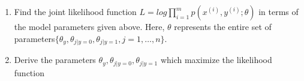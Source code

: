 \documentclass[submit]{harvardml}
\begin{document}
\begin{problem}
\begin{enumerate}[label=(\alph*)]In this problem, we look at maximum likelihood parameter estimation using the naive
Bayes assumption. Here, the input features $x_j, j = 1, . . . , n$ to our model are discrete,
binary-valued variables, so $x_j \in \{0, 1\}$. We call $x = [x_1,  x_2 , \dots  x_n]^T$ to be the input vector.
For each training example, our output targets are a single binary-value $y ∈ {0, 1}$. Our
model is then parameterized by $\theta_{j|y=0} = p(x_j = 1|y = 0), \theta_{j|y=1} = p(x_j = 1|y = 1)$, and
$\theta_y = p(y = 1)$. We model the joint distribution of $(x, y)$ according to
\begin{align*}
P(y)&=(\theta_y)^y (1-\theta_y)^{1-y}\\
p(x|y=0)&=\prod_{j=1}^n p(x_j|y=0)\\
p(x|y=1)&=\prod_{j=1}^n p(x_j|y=1)\\
\end{align*}
\item  Find the joint likelihood function $ L=log \prod_{i=1}^m p(x^{(i)},y^{(i)};\theta)$ in terms of the model parameters given above. Here, $\theta$ represents the entire set of parameters$\{\theta_y,\theta_{j|y=0},\theta_{j|y=1},j=1,\dots,n\}$.
\item Derive the parameters $\theta_y,\theta_{j|y=0},\theta_{j|y=1}$ which maximize the likelihood function 
\end{enumerate}
\vspace{0.1cm}
\end{problem}
\end{document}
